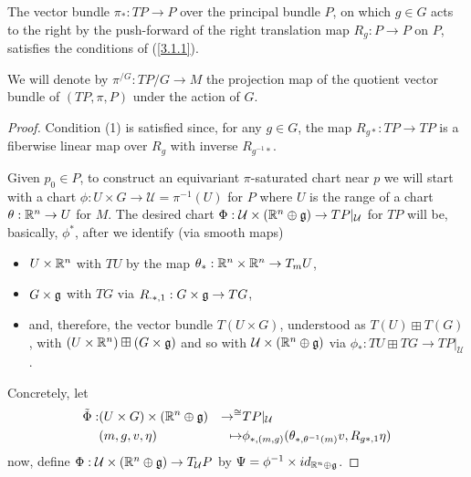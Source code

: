 \begin{theorem}
The vector bundle $\pi_*:TP \to P$ over the principal bundle $P$, on which $g \in G$ acts to the right by the push-forward of the right translation map $R_g: P \to P$ on $P$, satisfies the conditions of (\ref{3.1.1}).
\end{theorem}

We will denote by $\pi^{/G}:TP/G \to M$ the projection map of the quotient vector bundle of $(TP, \pi, P)$ under the action of $G$.

\begin{proof}
Condition (1) is satisfied since, for any $g \in G$, the map $R_{g*}:TP \to TP$ is a fiberwise linear map over $R_g$ with inverse $R_{g^{-1} *}$.

Given $p_0 \in P$, to construct an equivariant $\pi$-saturated chart near $p$ we will start with a chart $\phi:U \times G \to \mathcal U = \pi^{-1}(U)$ for $P$ where $U$ is the range of a chart $\theta:\mathbb{R}^n \to U$ for $M$. The desired chart $\Phi: \mathcal U \times (\mathbb{R}^n \oplus \mathfrak{g}) \to TP|_{\mathcal U}$ for $TP$ will be, basically, $\phi^*$, after we identify (via smooth maps) 
    \begin{itemize}
    
    \item $U \times \mathbb{R}^n$ with $TU$ by the map $\theta_{*}: \mathbb{R}^n \times \mathbb{R}^n \to T_m U$,  
    
    \item $G \times \mathfrak{g}$ with $TG$ via $R_{\cdot *, 1}: G \times \mathfrak{g} \to T G$,
    
    \item and, therefore, the vector bundle $T(U \times G)$, understood as $T(U) \boxplus T(G)$, with $(U \times \mathbb{R}^n) \boxplus (G \times \mathfrak{g})$ and so with $\mathcal U \times (\mathbb{R}^n \oplus \mathfrak{g})$ via $\phi_*: TU \boxplus TG \to TP|_{\mathcal U}$.
    
    \end{itemize}

Concretely, let
\begin{align*}
    \tilde \Phi :& (U \times G) \times (\RR^n \oplus \alg g) & \to^{\cong} & TP|_{\mathcal U} \\    
                 & (m, g, v, \eta) & \mapsto & \phi_{*, (m, g)}(\theta_{*, \theta^{-1}(m)} v, R_{g*, 1} \eta) 
\end{align*}
now, define $\Phi : \mathcal U \times (\mathbb{R}^n \oplus \mathfrak{g})  \to  T_{\mathcal U}P$ by $\Psi = \phi^{-1} \times id_{\RR^n \oplus \alg g}$. %


\end{proof}
